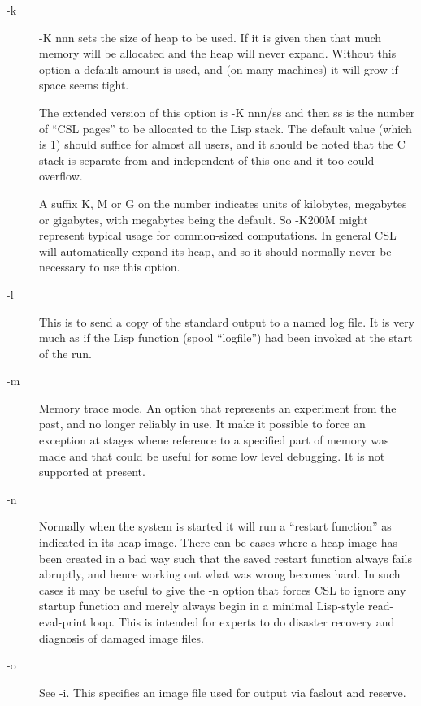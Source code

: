 \documentclass[a4paper,11pt]{article}
\begin{document}
\begin{description}
\item [{\ttfamily -k}] 
{\ttfamily -K nnn} sets the size of heap to be used.  If it is given then that much
memory will be allocated and the heap will never expand.  Without this
option a default amount is used, and (on many machines) it will grow
if space seems tight.
  
The extended version of this option is {\ttfamily -K nnn/ss} and then ss is the
number of ``CSL pages'' to be allocated to the Lisp stack. The default
value (which is 1) should suffice for almost all users, and it should
be noted that the C stack is separate from and independent of this one and
it too could overflow.
  
A suffix K, M or G on the number indicates units of kilobytes, megabytes or
gigabytes, with megabytes being the default. So {\ttfamily -K200M} might
represent typical usage for common-sized computations. In general CSL
will automatically expand its heap, and so it should normally never be
necessary to use this option.

\item [{\ttfamily -l}] 
This is to send a copy of the standard output to a named log file. It is
very much as if the Lisp function {\ttfamily (spool ``logfile'')} had been
invoked at the start of the run.

\item [{\ttfamily -m}] 
Memory trace mode. An option that represents an experiment from the past,
and no longer reliably in use. It make it possible to force an
exception at stages whene reference to a specified part of memory was made
and that could be useful for some low level debugging. It is not supported
at present.

\item [{\ttfamily -n}] 
Normally when the system is started it will run a ``restart function'' as
indicated in its heap image. There can be cases where a heap image has been
created in a bad way such that the saved restart function always fails
abruptly, and hence working out what was wrong becomes hard. In such cases
it may be useful to give the {\ttfamily -n} option that forces CSL to
ignore any startup function and merely always begin in a minimal Lisp-style
read-eval-print loop. This is intended for experts to do disaster recovery
and diagnosis of damaged image files.

\item [{\ttfamily -o}] 
See {\ttfamily -i}. This specifies an image file used for output via
{\ttfamily faslout} and {\ttfamily reserve}.


\end{description}
\end{document}
